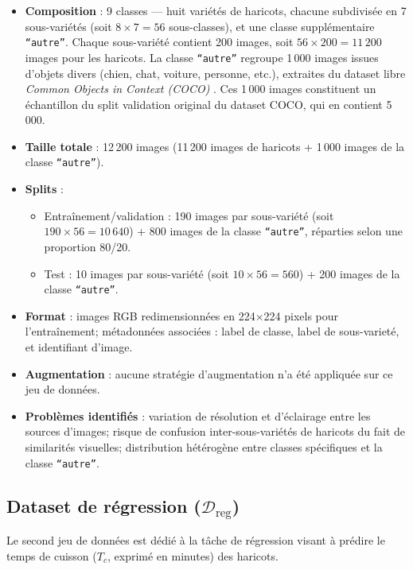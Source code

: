 \begin{itemize}
	\item \textbf{Composition} : 9 classes — huit variétés de haricots, chacune subdivisée en 7 sous-variétés (soit \(8 \times 7 = 56\) sous-classes), et une classe supplémentaire \texttt{``autre''}. Chaque sous-variété contient 200 images, soit \(56 \times 200 = 11\,200\) images pour les haricots. La classe \texttt{``autre''} regroupe 1\,000 images issues d’objets divers (chien, chat, voiture, personne, etc.), extraites du dataset libre \emph{Common Objects in Context (COCO)} \cite{lin2014microsoft}. Ces 1\,000 images constituent un échantillon du split validation original du dataset COCO, qui en contient 5\,000.
	\item \textbf{Taille totale} : 12\,200 images (11\,200 images de haricots + 1\,000 images de la classe \texttt{``autre''}).
	\item \textbf{Splits} :
	      \begin{itemize}
		      \item Entraînement/validation : 190 images par sous-variété (soit \(190 \times 56 = 10\,640\)) + 800 images de la classe \texttt{``autre''}, réparties selon une proportion 80/20.
		      \item Test : 10 images par sous-variété (soit \(10 \times 56 = 560\)) + 200 images de la classe \texttt{``autre''}.
	      \end{itemize}
	\item \textbf{Format} : images RGB redimensionnées en 224×224 pixels pour l’entraînement; métadonnées associées : label de classe, label de sous-varieté, et identifiant d’image.
	\item \textbf{Augmentation} : aucune stratégie d’augmentation n’a été appliquée sur ce jeu de données.
	\item \textbf{Problèmes identifiés} : variation de résolution et d’éclairage entre les sources d’images; risque de confusion inter-sous-variétés de haricots du fait de similarités visuelles; distribution hétérogène entre classes spécifiques et la classe \texttt{``autre''}.
\end{itemize}


\subsection{Dataset de régression (\(\mathcal{D}_{\text{reg}}\))}

Le second jeu de données est dédié à la tâche de régression visant à prédire le temps de cuisson (\(T_c\), exprimé en minutes) des haricots.

